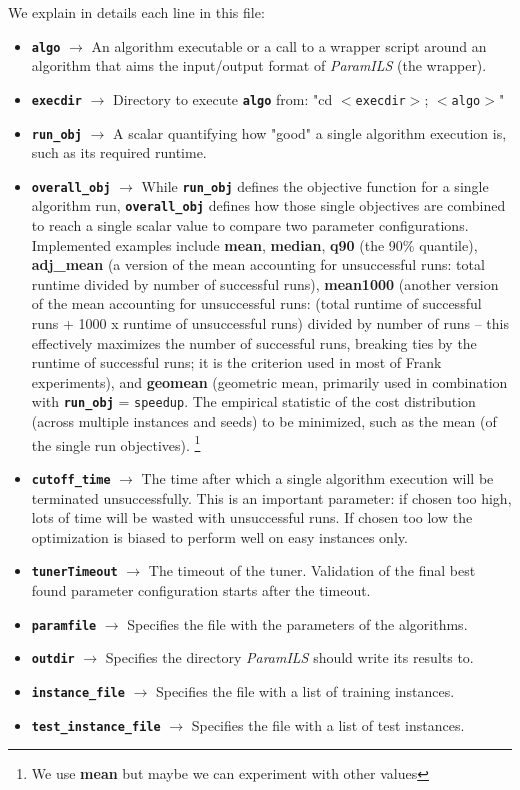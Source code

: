 We explain in details each line in this file:

\begin{itemize}
	\item \textbf{\texttt{algo}} $\rightarrow$ An algorithm executable or a call to a wrapper script around an algorithm that aims the input/output format of \textit{ParamILS} (the wrapper).
	\item \textbf{\texttt{execdir}} $\rightarrow$ Directory to execute \textbf{\texttt{algo}} from: "cd $<$\texttt{execdir}$>$; $<$\texttt{algo}$>$" 
	\item \textbf{\texttt{run\_obj}} $\rightarrow$ A scalar quantifying how "good" a single algorithm execution is, such as its required runtime.
	\item \textbf{\texttt{overall\_obj}} $\rightarrow$ While \textbf{\texttt{run\_obj}} defines the objective function for a single algorithm run, \textbf{\texttt{overall\_obj}} defines how those single objectives are combined to reach a single scalar value to compare two parameter configurations. Implemented examples include {\bf mean}, {\bf median}, {\bf q90} (the 90\% quantile), {\bf adj\_mean} (a version of the mean accounting for unsuccessful runs: total runtime divided by number of successful runs), {\bf mean1000} (another version of the mean accounting for unsuccessful runs: (total runtime of successful runs + 1000 x runtime of unsuccessful runs) divided by number of runs -- this effectively maximizes the number of successful runs, breaking ties by the runtime of successful runs; it is the criterion used in most of Frank experiments), and {\bf geomean} (geometric mean, primarily used in combination with \textbf{\texttt{run\_obj}} = \texttt{speedup}. The empirical statistic of the cost distribution (across multiple instances and seeds) to be minimized, such as the mean (of the single run objectives). \footnote{We use {\bf mean} but maybe we can experiment with other values}
	\item \textbf{\texttt{cutoff\_time}} $\rightarrow$ The time after which a single algorithm execution will be terminated unsuccessfully. This is an important parameter: if chosen too high, lots of time will be wasted with unsuccessful runs. If chosen too low the optimization is biased to perform well on easy instances only.
	\item \textbf{\texttt{tunerTimeout}} $\rightarrow$ The timeout of the tuner. Validation of the final best found parameter configuration starts after the timeout.
	\item \textbf{\texttt{paramfile}} $\rightarrow$ Specifies the file with the parameters of the algorithms. 
	\item \textbf{\texttt{outdir}} $\rightarrow$ Specifies the directory \textit{ParamILS} should write its results to.
	\item \textbf{\texttt{instance\_file}} $\rightarrow$ Specifies the file with a list of training instances. 
	\item \textbf{\texttt{test\_instance\_file}} $\rightarrow$ Specifies the file with a list of test instances.
\end{itemize}


